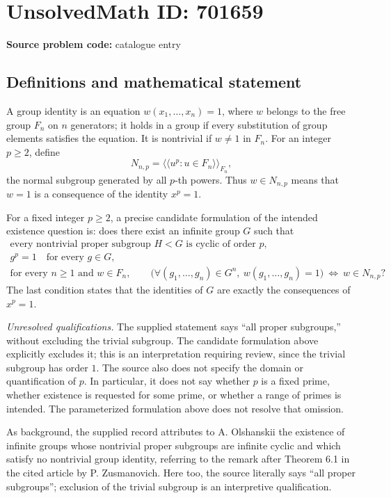 \documentclass[11pt]{article}
\begin{document}
\section*{UnsolvedMath ID: 701659}
\textbf{Source problem code:} catalogue entry
\subsection{Definitions and mathematical statement}
A group identity is an equation \(w(x_1,\ldots,x_n)=1\), where \(w\) belongs to the free group \(F_n\) on \(n\) generators; it holds in a group if every substitution of group elements satisfies the equation. It is nontrivial if \(w\ne 1\) in \(F_n\). For an integer \(p\ge 2\), define
\[
N_{n,p}=\langle\!\langle u^p : u\in F_n\rangle\!\rangle_{F_n},
\]
the normal subgroup generated by all \(p\)-th powers. Thus \(w\in N_{n,p}\) means that \(w=1\) is a consequence of the identity \(x^p=1\).

For a fixed integer \(p\ge 2\), a precise candidate formulation of the intended existence question is: does there exist an infinite group \(G\) such that
\[
\begin{gathered}
\text{every nontrivial proper subgroup }H<G\text{ is cyclic of order }p,\\
 g^p=1\quad\text{for every }g\in G,\\
\text{for every }n\ge 1\text{ and }w\in F_n,\qquad
\bigl(\forall(g_1,\ldots,g_n)\in G^n,\ w(g_1,\ldots,g_n)=1\bigr)
\ \Longleftrightarrow\ w\in N_{n,p}?
\end{gathered}
\]
The last condition states that the identities of \(G\) are exactly the consequences of \(x^p=1\).

\emph{Unresolved qualifications.} The supplied statement says ``all proper subgroups,'' without excluding the trivial subgroup. The candidate formulation above explicitly excludes it; this is an interpretation requiring review, since the trivial subgroup has order \(1\). The source also does not specify the domain or quantification of \(p\). In particular, it does not say whether \(p\) is a fixed prime, whether existence is requested for some prime, or whether a range of primes is intended. The parameterized formulation above does not resolve that omission.

As background, the supplied record attributes to A. Olshanskii the existence of infinite groups whose nontrivial proper subgroups are infinite cyclic and which satisfy no nontrivial group identity, referring to the remark after Theorem 6.1 in the cited article by P. Zusmanovich. Here too, the source literally says ``all proper subgroups''; exclusion of the trivial subgroup is an interpretive qualification.
\end{document}

